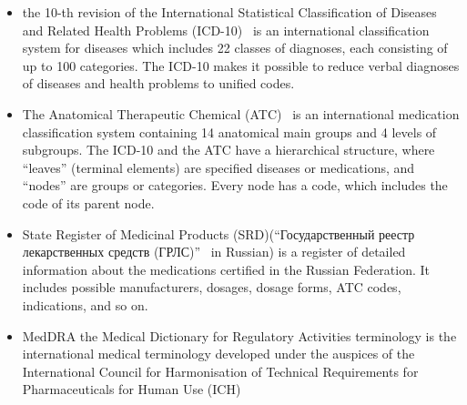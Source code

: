 \documentclass[a4paper,fleqn,longmktitle]{cas-dc}
\begin{document}
\begin{itemize}
    \item 
    the 10-th revision of the International Statistical Classification of Diseases and Related Health Problems (ICD-10)~\cite{ICD-10} is an international classification system for diseases which includes 22 classes of diagnoses, each consisting of up to 100 categories. The ICD-10 makes it possible to reduce verbal diagnoses of diseases and health problems to unified codes.
    \item The Anatomical Therapeutic Chemical (ATC)~\cite{miller1995new} is an international medication classification system containing 14  anatomical main groups and 4 levels of subgroups. The ICD-10 and the ATC have a hierarchical structure, where ``leaves'' (terminal elements) are specified diseases or medications, and ``nodes'' are groups or categories. Every node has a code, which includes the code of its parent node.
    \item State Register of Medicinal Products (SRD)(``Государственный реестр лекарственных средств (ГРЛС)''~\cite{SRD} in Russian) is a register of detailed information about the medications certified in the Russian Federation. It includes possible manufacturers, dosages, dosage forms, ATC codes, indications, and so on.
    \item MedDRA\textregistered{}  the Medical Dictionary for Regulatory Activities terminology is the international medical terminology developed under the auspices of the International Council for Harmonisation of Technical Requirements for Pharmaceuticals for Human Use (ICH)
\end{itemize}
\end{document}
